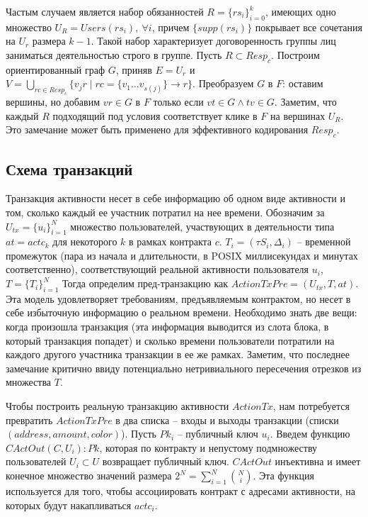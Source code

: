 \documentclass[specification,annotation]{itmo-student-thesis}
\begin{document}
Частым случаем является набор обязанностей $R = \{rs_i\}_{i=0}^k$,
имеющих одно множество $U_R = Users(rs_i), \ \forall i $, причем
$\{supp(rs_i)\}$ покрывает все сочетания на $U_r$ размера $k-1$. Такой
набор характеризует договоренность группы лиц заниматься деятельностью
строго в группе. Пусть $R \subset Resp_c$. Построим ориентированный
граф $G$, приняв $E = U_r$ и $V = \bigcup_{rc \in Resp_c}{\{v_jr \mid
  rc = \{v_1\ldots v_{s(j)}\} \rightarrow r\}}$. Преобразуем $G$ в
$F$: оставим вершины, но добавим $vr \in G$ в $F$ только если $vt \in
G \wedge tv \in G$. Заметим, что каждый $R$ подходящий под условия
соответствует клике в $F$ на вершинах $U_R$. Это замечание может быть
применено для эффективного кодирования $Resp_c$.

\subsection{Схема транзакций}

Транзакция активности несет в себе информацию об одном виде активности
и том, сколько каждый ее участник потратил на нее времени. Обозначим
за $U_{tx} = \{u_i\}_{i=1}^N$ множество пользователей, участвующих в
деятельности типа $at = actc_k$ для некоторого $k$ в рамках контракта
$c$. $T_i = (\tau S_i, \Delta_i)$ -- временной промежуток (пара из
начала и длительности, в POSIX миллисекундах и минутах
соответственно), соответствующий реальной активности пользователя
$u_i$, $T = \{T_i\}_{i=1}^N$ Тогда определим пред-транзакцию как
$ActionTxPre = (U_{tx}, T, at)$. Эта модель удовлетворяет требованиям,
предъявляемым контрактом, но несет в себе избыточную информацию о
реальном времени. Необходимо знать две вещи: когда произошла
транзакция (эта информация выводится из слота блока, в который
транзакция попадет) и сколько времени пользователи потратили на
каждого другого участника транзакции в ее же рамках. Заметим, что
последнее замечание критично ввиду потенциально нетривиального
пересечения отрезков из множества $T$.

Чтобы построить реальную транзакцию активности $ActionTx$, нам
потребуется превратить $ActionTxPre$ в два списка -- входы и выходы
транзакции (списки $(address,amount,color)$). Пусть $Pk_i$ --
публичный ключ $u_i$. Введем функцию $CActOut(C, U_i) : Pk$, которая
по контракту и непустому подмножеству пользователей $U_i \subset U$
возвращает публичный ключ. $CActOut$ инъективна и имеет конечное множество
значений размера $2^N = \sum_{i=1}^N{\binom{N}{i}}$. Эта функция
используется для того, чтобы ассоциировать контракт с адресами
активности, на которых будут накапливаться $actc_i$.
\end{document}
